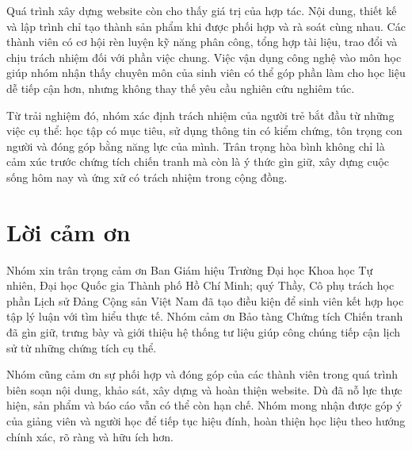 Quá trình xây dựng website còn cho thấy giá trị của hợp tác. Nội dung, thiết kế và lập trình chỉ tạo thành sản phẩm khi được phối hợp và rà soát cùng nhau. Các thành viên có cơ hội rèn luyện kỹ năng phân công, tổng hợp tài liệu, trao đổi và chịu trách nhiệm đối với phần việc chung. Việc vận dụng công nghệ vào môn học giúp nhóm nhận thấy chuyên môn của sinh viên có thể góp phần làm cho học liệu dễ tiếp cận hơn, nhưng không thay thế yêu cầu nghiên cứu nghiêm túc.

Từ trải nghiệm đó, nhóm xác định trách nhiệm của người trẻ bắt đầu từ những việc cụ thể: học tập có mục tiêu, sử dụng thông tin có kiểm chứng, tôn trọng con người và đóng góp bằng năng lực của mình. Trân trọng hòa bình không chỉ là cảm xúc trước chứng tích chiến tranh mà còn là ý thức gìn giữ, xây dựng cuộc sống hôm nay và ứng xử có trách nhiệm trong cộng đồng.

\section{Lời cảm ơn}

Nhóm xin trân trọng cảm ơn Ban Giám hiệu Trường Đại học Khoa học Tự nhiên, Đại học Quốc gia Thành phố Hồ Chí Minh; quý Thầy, Cô phụ trách học phần Lịch sử Đảng Cộng sản Việt Nam đã tạo điều kiện để sinh viên kết hợp học tập lý luận với tìm hiểu thực tế. Nhóm cảm ơn Bảo tàng Chứng tích Chiến tranh đã gìn giữ, trưng bày và giới thiệu hệ thống tư liệu giúp công chúng tiếp cận lịch sử từ những chứng tích cụ thể.

Nhóm cũng cảm ơn sự phối hợp và đóng góp của các thành viên trong quá trình biên soạn nội dung, khảo sát, xây dựng và hoàn thiện website. Dù đã nỗ lực thực hiện, sản phẩm và báo cáo vẫn có thể còn hạn chế. Nhóm mong nhận được góp ý của giảng viên và người học để tiếp tục hiệu đính, hoàn thiện học liệu theo hướng chính xác, rõ ràng và hữu ích hơn.

\clearpage
